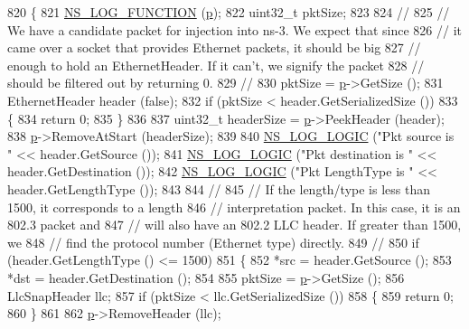 \begin{DoxyCode}
820 \{
821   \hyperlink{log-macros-disabled_8h_a90b90d5bad1f39cb1b64923ea94c0761}{NS\_LOG\_FUNCTION} (\hyperlink{lte__link__budget_8m_ac9de518908a968428863f829398a4e62}{p});
822   uint32\_t pktSize;
823 
824   \textcolor{comment}{//}
825   \textcolor{comment}{// We have a candidate packet for injection into ns-3.  We expect that since}
826   \textcolor{comment}{// it came over a socket that provides Ethernet packets, it should be big }
827   \textcolor{comment}{// enough to hold an EthernetHeader.  If it can't, we signify the packet }
828   \textcolor{comment}{// should be filtered out by returning 0.}
829   \textcolor{comment}{//}
830   pktSize = \hyperlink{lte__link__budget_8m_ac9de518908a968428863f829398a4e62}{p}->GetSize ();
831   EthernetHeader header (\textcolor{keyword}{false});
832   \textcolor{keywordflow}{if} (pktSize < header.GetSerializedSize ())
833     \{
834       \textcolor{keywordflow}{return} 0;
835     \}
836 
837   uint32\_t headerSize = \hyperlink{lte__link__budget_8m_ac9de518908a968428863f829398a4e62}{p}->PeekHeader (header);
838   \hyperlink{lte__link__budget_8m_ac9de518908a968428863f829398a4e62}{p}->RemoveAtStart (headerSize);
839 
840   \hyperlink{group__logging_ga88acd260151caf2db9c0fc84997f45ce}{NS\_LOG\_LOGIC} (\textcolor{stringliteral}{"Pkt source is "} << header.GetSource ());
841   \hyperlink{group__logging_ga88acd260151caf2db9c0fc84997f45ce}{NS\_LOG\_LOGIC} (\textcolor{stringliteral}{"Pkt destination is "} << header.GetDestination ());
842   \hyperlink{group__logging_ga88acd260151caf2db9c0fc84997f45ce}{NS\_LOG\_LOGIC} (\textcolor{stringliteral}{"Pkt LengthType is "} << header.GetLengthType ());
843 
844   \textcolor{comment}{//}
845   \textcolor{comment}{// If the length/type is less than 1500, it corresponds to a length }
846   \textcolor{comment}{// interpretation packet.  In this case, it is an 802.3 packet and }
847   \textcolor{comment}{// will also have an 802.2 LLC header.  If greater than 1500, we}
848   \textcolor{comment}{// find the protocol number (Ethernet type) directly.}
849   \textcolor{comment}{//}
850   \textcolor{keywordflow}{if} (header.GetLengthType () <= 1500)
851     \{
852       *src = header.GetSource ();
853       *dst = header.GetDestination ();
854 
855       pktSize = \hyperlink{lte__link__budget_8m_ac9de518908a968428863f829398a4e62}{p}->GetSize ();
856       LlcSnapHeader llc;
857       \textcolor{keywordflow}{if} (pktSize < llc.GetSerializedSize ())
858         \{
859           \textcolor{keywordflow}{return} 0;
860         \}
861 
862       \hyperlink{lte__link__budget_8m_ac9de518908a968428863f829398a4e62}{p}->RemoveHeader (llc);

\end{DoxyCode}
